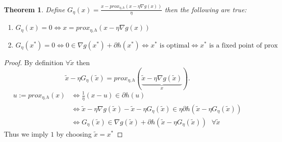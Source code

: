 \documentclass[a4paper]{article}
\newtheorem{thm}{Theorem}[section]
\begin{document}
\begin{thm}
    Define $G_\eta(x)=\frac{x-prox_{\eta,h}(x-\eta\nabla g(x))}{\eta}$ then the following are true:
    \begin{enumerate}
        \item $G_\eta(x)=0 \iff x=prox_{\eta,h}(x-\eta\nabla g(x))$ 
        \item $G_\eta(x^*)=0 \iff 0\in \nabla g(x^*)+\partial h(x^*)\iff x^* \text{ is optimal} \iff x^* \text{ is a fixed point of prox}$
    \end{enumerate}
\end{thm}
\begin{proof}
    By definition $\forall \tilde{x}$ then \[
        \tilde{x}-\eta G_\eta(\tilde{x})=prox_{\eta,h}(\underbrace{\tilde{x}-\eta\nabla g(\tilde{x})}_{x})
    .\] 
    \begin{align*}
        u:=prox_{\eta,h}(x)&\iff \frac{1}{\eta}(x-u)\in \partial h(u)\\
        &\iff \tilde{x}-\eta\nabla g(\tilde{x})-\tilde{x}-\eta G_\eta(\tilde{x})\in \eta \partial h(\tilde{x}-\eta G_\eta(\tilde{x}))\\
        &\iff G_\eta(\tilde{x})\in \nabla g(\tilde{x})+\partial h(\tilde{x}-\eta G_\eta(\tilde{x})) \text{ } \forall \tilde{x}
    \end{align*}
    Thus we imply $1$ by choosing $\tilde{x}=x^*$
\end{proof}
\newpage
\end{document}
